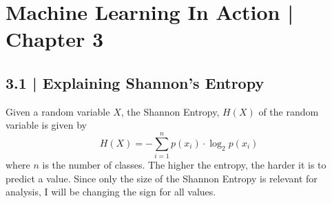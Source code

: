 \documentclass[11pt]{article}
\begin{document}
\section*{Machine Learning In Action | Chapter 3}
\subsection*{3.1 | Explaining Shannon's Entropy}
Given a random variable $X$, the Shannon Entropy, $H(X)$ of the random variable is given by 
\begin{equation}
H(X) = -\sum_{i=1}^n p(x_i)\cdot \log_2p(x_i)
\end{equation}
where $n$ is the number of classes. The higher the entropy, the harder it is to predict a value. Since only the size of the Shannon Entropy is relevant for analysis, I will be changing the sign for all values.
\end{document}
